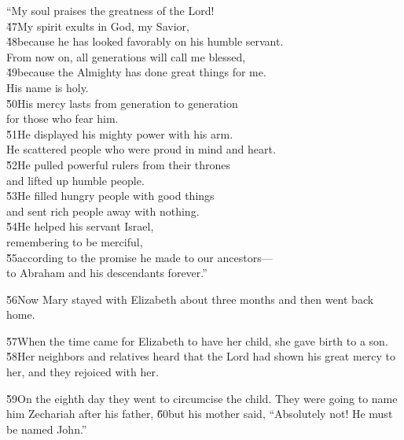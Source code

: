 \begin{poetry}
\poeml ``My soul praises the greatness of the Lord! \\
\poeml \v{47}My spirit exults in God, my Savior, \\
\poeml \v{48}because he has looked favorably on his humble servant. \\
\poeml From now on, all generations will call me blessed, \\
\poeml \v{49}because the Almighty has done great things for me. \\
\poemlll       His name is holy. \\
\poeml \v{50}His mercy lasts from generation to generation \\
\poemll    for those who fear him. \\
\poeml \v{51}He displayed his mighty power with his arm. \\
\poemll    He scattered people who were proud in mind and heart. \\
\poeml \v{52}He pulled powerful rulers from their thrones \\
\poemll    and lifted up humble people. \\
\poeml \v{53}He filled hungry people with good things \\
\poemll    and sent rich people away with nothing. \\
\poeml \v{54}He helped his servant Israel, \\
\poemll    remembering to be merciful, \\
\poeml \v{55}according to the promise he made to our ancestors--- \\
\poemll    to Abraham and his descendants forever.''
\end{poetry}

\v{56}Now Mary stayed with Elizabeth about three months and then went back home.

\v{57}When the time came for Elizabeth to have her child, she gave birth to a son. \v{58}Her neighbors and relatives heard that the Lord had shown his great mercy to her, and they rejoiced with her.

\v{59}On the eighth day they went to circumcise the child. They were going to name him Zechariah after his father, \v{60}but his mother said, ``Absolutely not! He must be named John.''

